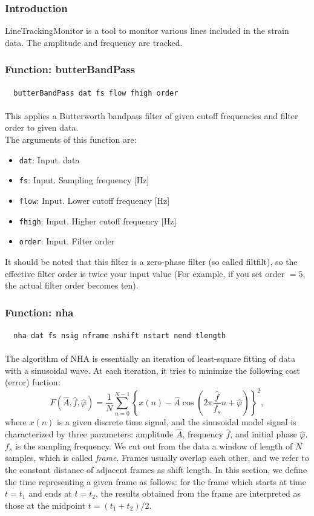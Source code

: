 \subsubsection{\bf Introduction}
LineTrackingMonitor is a tool to monitor various lines included in the strain data.
The amplitude and frequency are tracked.


\subsubsection{{\bf Function:} butterBandPass}
{\tt ~ butterBandPass dat fs flow fhigh order\\}
\\
This applies a Butterworth bandpass filter of given cutoff frequencies and filter order to given data.
\\
The arguments of this function are:
\begin{itemize}
\item {\tt dat}: Input. data
\item {\tt fs}: Input. Sampling frequency [Hz]
\item {\tt flow}: Input. Lower cutoff frequency [Hz]
\item {\tt fhigh}: Input. Higher cutoff frequency [Hz]
\item {\tt order}: Input. Filter order
\end{itemize}

It should be noted that this filter is a zero-phase filter (so called filtfilt), so the effective filter order is twice your input value (For example, if you set order $= 5$, the actual filter order becomes ten).


\subsubsection{{\bf Function:} nha}
{\tt ~ nha dat fs nsig nframe nshift nstart nend tlength\\}
\\
The algorithm of NHA is essentially an iteration of least-square fitting of data with a sinusoidal wave. At each iteration, it tries to minimize the following cost (error) fuction:
\begin{equation}
F(\hat{A},\hat{f},\hat{\varphi})=\frac{1}{N}\sum_{n=0}^{N-1} \left\{ x(n) - \hat{A} \cos \left(2\pi \frac{\hat{f}}{f_{s}}n+\hat{\varphi} \right) \right\}^2,
\label{eq:nha_cost}
\end{equation}
where $x(n)$ is a given discrete time signal, and the sinusoidal model signal is characterized by three parameters: amplitude $\hat{A}$, frequency $\hat{f}$, and initial phase $\hat{\varphi}$. $f_{s}$ is the sampling frequency. We cut out from the data a window of length of $N$ samples, which is called {\it frame}. Frames usually overlap each other, and we refer to the constant distance of adjacent frames as shift length. In this section, we define the time representing a given frame as follows: for the frame which starts at time $t=t_{1}$ and ends at $t=t_{2}$, the results obtained from the frame are interpreted as those at the midpoint $t=(t_{1}+t_{2})/2$.

